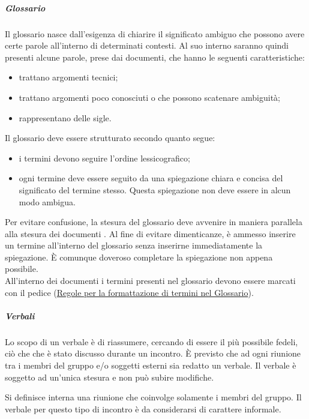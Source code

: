 \documentclass[../NormeProgetto.tex]{subfiles}
\begin{document}
		\subparagraph{Glossario} \label{sec:Glossario}
		Il glossario nasce dall'esigenza di chiarire il significato ambiguo che possono avere certe parole all'interno di determinati contesti. Al suo interno saranno quindi presenti alcune parole, prese dai documenti, che hanno le seguenti caratteristiche:
		\begin{itemize}
			\item trattano argomenti tecnici;
			\item trattano argomenti poco conosciuti o che possono scatenare ambiguità;
			\item rappresentano delle sigle.
		\end{itemize}
		Il glossario deve essere strutturato secondo quanto segue:
		\begin{itemize}
			\item i termini devono seguire l'ordine lessicografico;
			\item ogni termine deve essere seguito da una spiegazione chiara e concisa del significato del termine stesso. Questa spiegazione non deve essere in alcun modo ambigua.
		\end{itemize}
		Per evitare confusione, la stesura del glossario deve avvenire in maniera parallela alla stesura dei documenti . Al fine di evitare dimenticanze, è ammesso inserire un termine all'interno del glossario senza inserirne immediatamente la spiegazione. È comunque doveroso completare la spiegazione non appena possibile. \\ All'interno dei documenti i termini presenti nel glossario devono essere marcati con il pedice \g (\hyperref[sec:Formattazione termini nel glossario]{Regole per la formattazione di termini nel Glossario}).
		
		\subparagraph{Verbali}
		Lo scopo di un verbale è di riassumere, cercando di essere il più possibile fedeli, ciò che che è stato discusso durante un incontro. È previsto che ad ogni riunione tra i membri del gruppo e/o soggetti esterni sia redatto un verbale. Il verbale è soggetto ad un'unica stesura e non può subire modifiche.
			
			Si definisce interna una riunione che coinvolge solamente i membri del gruppo. Il verbale per questo tipo di incontro è da considerarsi di carattere informale. 
			
\end{document}

